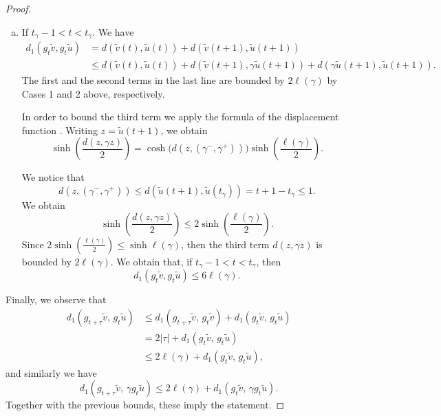 \documentclass[a4paper,english,reqno]{amsart}
\renewcommand{\H}{\mathbb{H}}
\theoremstyle{definition}
\numberwithin{equation}{section}
\begin{document}
\begin{proof}
\begin{enumerate}[(a)]
 	\item If $t_\gamma -1 < t < t_\gamma$. We have
 	\begin{align*}
 		d_1(g_{t}\tilde v, g_t \tilde u) &= d(\tilde v (t), \tilde u (t)) + d(\tilde v (t+1), \tilde u (t+1)) \\
 		&\le  d(\tilde v (t), \tilde u (t)) + d(\tilde v (t+1), \gamma \tilde u (t+1)) + d( \gamma \tilde u (t+1), \tilde u (t+1)).
 	\end{align*}
	The first and the second terms in the last line are bounded by $2\ell (\gamma)$ by Cases 1 and 2 above, respectively. 
 	
	In order to bound the third term we apply the formula of the displacement function \cite[Theorem 7.35.1]{Beardon}. Writing $z= \tilde u(t+1)$, we obtain
 	\begin{equation*}\label{eq:5.11}
 		\sinh\!\left(\frac{d(z, \gamma z)}{2}\right)
 		=
 		\cosh \bigl(d(z, (\gamma^-, \gamma^+))\bigr)
 		\sinh\!\left(\frac{\ell(\gamma)}{2}\right).
 	\end{equation*}
 
 We notice that \[ d(z, (\gamma^-, \gamma^+) )  \le d(\tilde u(t+1), \tilde u (t_\gamma) ) = t+1 - t_\gamma \le 1 .\] We obtain 
 \[
 \sinh\!\left(\frac{d(z, \gamma z)}{2}\right) \leq 2 \sinh\!\left(\frac{\ell(\gamma)}{2}\right).
 \]
 Since $2\sinh(\frac{\ell(\gamma)}{2})\leq \sinh \ell(\gamma)$, then the third term $d(z,\gamma z)$ is bounded by $2\ell(\gamma)$. We obtain that, if $t_\gamma -1 < t < t_\gamma$, then 
 \[
 d_1(g_{t}\tilde v, g_t \tilde u) \le 6 \ell(\gamma).
 \]
 
 
 \end{enumerate}

Finally, we observe that 
\begin{align*}
	d_1\!\left(g_{t+\tau} \tilde v ,\, g_t\tilde u\right) & \le d_1\!\left(g_{t+\tau} \tilde v ,\, g_t\tilde v\right) + d_1\!\left(g_{t} \tilde v ,\, g_t\tilde u\right)\\
	& =  2|\tau| + d_1\!\left(g_{t} \tilde v ,\, g_t\tilde u\right) \\
	&\le  2\ell(\gamma) + d_1\!\left(g_{t} \tilde v ,\, g_t\tilde u\right),
\end{align*}
and similarly we have
\[
d_1\!\left(g_{t+\tau} \tilde v ,\, \gamma g_t\tilde u\right) \le 2\ell(\gamma) + d_1\!\left(g_{t} \tilde v ,\, \gamma g_t\tilde u\right).
\]
Together with the previous bounds, these imply the statement.
 \end{proof}

\end{document}
